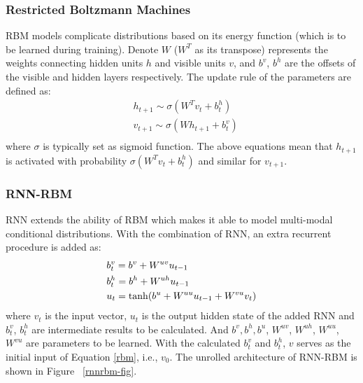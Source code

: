 \documentclass[twoside,leqno,twocolumn]{article}
\begin{document}
\subsubsection{Restricted Boltzmann Machines}
RBM models complicate distributions based on its energy function (which is to be learned during training). Denote $W$ ($W^T$ as its transpose) represents the weights connecting hidden units $h$ and visible units $v$, and $b^v$, $b^h$ are the offsets of the visible and hidden layers respectively. The update rule of the parameters are defined as:
\begin{equation}
\begin{aligned}
&h_{t+1}\sim \sigma(W^Tv_t+b^h_t)\\
&v_{t+1}\sim \sigma(Wh_{t+1}+b^v_t)\\
\end{aligned}
\label{rbm}
\end{equation}
where $\sigma$ is typically set as sigmoid function. The above equations mean that $h_{t+1}$ is activated with probability $\sigma(W^Tv_t+b^h_t)$ and similar for $v_{t+1}$.
\subsubsection{RNN-RBM}
RNN extends the ability of RBM which makes it able to model multi-modal conditional distributions. With the combination of RNN, an extra recurrent procedure is added as:
\begin{equation}
\begin{aligned}
\label{rnnrbm}
\centering
&b^v_t=b^v+W^{uv}u_{t-1}\\
&b^h_t=b^h+W^{uh}u_{t-1}\\
&u_t=\tanh(b^u+W^{uu}u_{t-1}+W^{vu}v_t)
\end{aligned}
\end{equation}
where $v_t$ is the input vector, $u_t$ is the output hidden state of the added RNN and $b^v_t$, $b^h_t$ are intermediate results to be calculated. And $b^v, b^h, b^u$, $W^{uv}$, $W^{uh}$, $W^{uu}$, $W^{vu}$ are parameters to be learned. With the calculated $b^v_t$ and $b^h_t$, $v$ serves as the initial input of Equation \ref{rbm}, i.e., $v_0$. The unrolled architecture of RNN-RBM is shown in Figure ~\ref{rnnrbm-fig}. 
\end{document}

